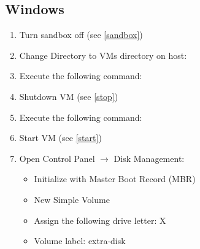 \subsection*{Windows}
\begin{enumerate}
\item Turn sandbox off (see \ref{sandbox})
\item Change Directory to VMs directory on host:\\
\item Execute the following command:\\
\item Shutdown VM (see \ref{stop})
\item Execute the following command:\\
\item Start VM (see \ref{start})
\item Open Control Panel $\rightarrow$ Disk Management:
\begin{itemize}
	\item Initialize with Master Boot Record (MBR)
	\item New Simple Volume
	\item Assign the following drive letter: X
	\item Volume label: extra-disk       
\end{itemize}
\end{enumerate}